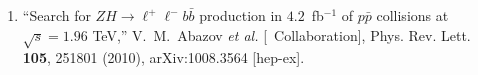 \begin{enumerate}
\item ``Search for $ZH \rightarrow \ell^+\ell^-b\bar{b}$ production in
$4.2$~fb$^{-1}$ of $p\bar{p}$ collisions at $\sqrt{s}=1.96$ TeV,''
V.~M.~Abazov {\it et al.}  [\dzero\ Collaboration],
Phys. Rev. Lett. {\bf 105}, 251801 (2010),
arXiv:1008.3564 [hep-ex].








\end{enumerate}
